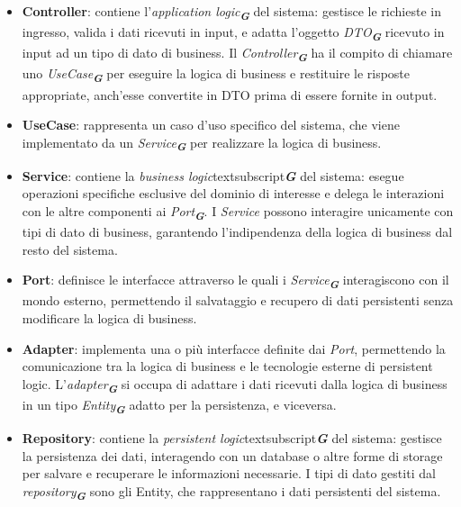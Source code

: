\begin{itemize}
    \item \textbf{Controller}: contiene l'\emph{application logic}\textsubscript{\textbf{\textit{G}}} del sistema: gestisce le richieste in ingresso, valida i dati ricevuti in input, e adatta l'oggetto \emph{DTO}\textsubscript{\textbf{\textit{G}}} ricevuto in input ad un tipo di dato di business. Il \emph{Controller}\textsubscript{\textbf{\textit{G}}} ha il compito di chiamare uno \emph{UseCase}\textsubscript{\textbf{\textit{G}}} per eseguire la logica di business e restituire le risposte appropriate, anch'esse convertite in DTO prima di essere fornite in output.
    \item \textbf{UseCase}: rappresenta un caso d'uso specifico del sistema, che viene implementato da un \emph{Service}\textsubscript{\textbf{\textit{G}}} per realizzare la logica di business.
    \item \textbf{Service}: contiene la \emph{business logic}textsubscript{\textbf{\textit{G}}} del sistema: esegue operazioni specifiche esclusive del dominio di interesse e delega le interazioni con le altre componenti ai \emph{Port}\textsubscript{\textbf{\textit{G}}}. I \emph{Service} possono interagire unicamente con tipi di dato di business, garantendo l'indipendenza della logica di business dal resto del sistema.
    \item \textbf{Port}: definisce le interfacce attraverso le quali i \emph{Service}\textsubscript{\textbf{\textit{G}}} interagiscono con il mondo esterno, permettendo il salvataggio e recupero di dati persistenti senza modificare la logica di business.
    \item \textbf{Adapter}: implementa una o più interfacce definite dai \emph{Port}, permettendo la comunicazione tra la logica di business e le tecnologie esterne di persistent logic. L'\emph{adapter}\textsubscript{\textbf{\textit{G}}} si occupa di adattare i dati ricevuti dalla logica di business in un tipo \emph{Entity}\textsubscript{\textbf{\textit{G}}} adatto per la persistenza, e viceversa.
    \item \textbf{Repository}: contiene la \emph{persistent logic}textsubscript{\textbf{\textit{G}}} del sistema: gestisce la persistenza dei dati, interagendo con un database o altre forme di storage per salvare e recuperare le informazioni necessarie. I tipi di dato gestiti dal \emph{repository}\textsubscript{\textbf{\textit{G}}} sono gli Entity, che rappresentano i dati persistenti del sistema.
\end{itemize}

